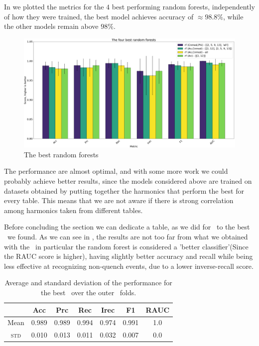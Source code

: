 In  we plotted the metrics for the $4$ best performing random forests,
independently of how they were trained, the best model achieves accuracy of $\approx 98.8\%$, while
the other models remain above $98\%$.
\begin{figure}
	\centering
	\includegraphics[width=\linewidth]{img/best_rfs.png}
	\caption{The best random forests} \label{fig:best-rfs}
\end{figure}
The performance are almost optimal, and with some more work we could probably achieve better
results, since the models considered above are trained on datasets obtained by putting together the
harmonics that perform the best for every table. This means that we are not aware if there is
strong correlation among harmonics taken from different tables.

Before concluding the section we can dedicate a table, as we did for \dts\, to the best \rf\ we
found. As we can see in , the results are not too far from what we obtained with
the \dt\ in particular the random forest is considered a 'better classifier'(Since the RAUC score is
higher), having slightly better accuracy and recall while being less effective at recognizing
non-quench events, due to a lower inverse-recall score.
\begin{table}[t]
	\caption{Average and standard deviation of the performance for the best \rf\ over the outer \cv\
		folds.}\label{tbl:rf-cnmod-phi-perf}

	\bigskip
	\setlength{\tabcolsep}{6pt}
	\centering
	\begin{tabular}{ccccccc}
		\toprule
		\textbf{}    & \textbf{Acc} & \textbf{Prc} & \textbf{Rec} & \textbf{Irec} & \textbf{F1} & \textbf{RAUC} \\
		\midrule
		Mean         & 0.989        & 0.989        & 0.994        & 0.974         & 0.991
		             & 1.0                                                                                      \\
		\textsc{std} & 0.010        & 0.013        & 0.011        & 0.032         & 0.007
		             & 0.0                                                                                      \\
		\bottomrule
	\end{tabular}
\end{table}

